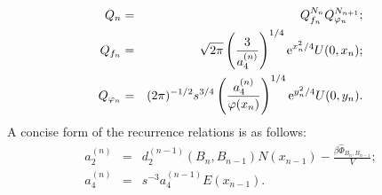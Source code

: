 \begin{eqnarray*}
	Q_n & = & Q_{f_n}^{N_n} Q_{\varphi_{n}}^{N_{n+1}};
\\
	Q_{f_n} & = & \sqrt{2\pi}\left(\frac{3}{a_4^{(n)}}\right)^{1/4} {\rm e}^{x_n^2/4} U(0,x_n);
\\
	Q_{\varphi_n} & = & (2\pi)^{-1/2} s^{3/4} \left(\frac{a_4^{(n)}}{\varphi(x_n)}\right)^{1/4} {\rm e}^{y_n^2/4} U(0,y_n).
\end{eqnarray*}
A concise form of the recurrence relations is as follows:
\begin{eqnarray*}
	a_2^{(n)} & = & d_2^{(n-1)}(B_n, B_{n-1}) N(x_{n-1}) - \frac{\beta\hat{\Phi}_{B_n, B_{n-1}}}{V};
	\\
	a_4^{(n)} & = & s^{-3} a_4^{(n-1)} E(x_{n-1}).
\end{eqnarray*}

